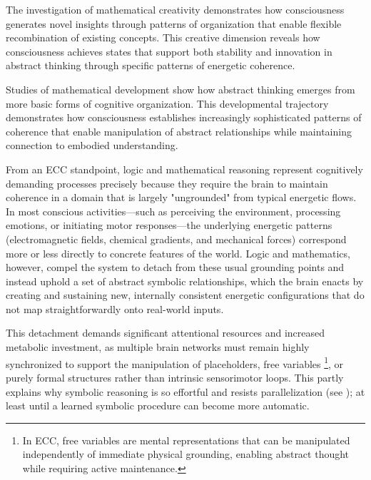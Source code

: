 The investigation of mathematical creativity \cite{Hadamard1945} demonstrates how consciousness generates novel insights through patterns of organization that enable flexible recombination of existing concepts. This creative dimension reveals how consciousness achieves states that support both stability and innovation in abstract thinking through specific patterns of energetic coherence.

Studies of mathematical development \cite{Piaget1952} show how abstract thinking emerges from more basic forms of cognitive organization. This developmental trajectory demonstrates how consciousness establishes increasingly sophisticated patterns of coherence that enable manipulation of abstract relationships while maintaining connection to embodied understanding.

From an ECC standpoint, logic and mathematical reasoning represent cognitively demanding processes precisely because they require the brain to maintain coherence in a domain that is largely "ungrounded" from typical energetic flows. In most conscious activities—such as perceiving the environment, processing emotions, or initiating motor responses—the underlying energetic patterns (electromagnetic fields, chemical gradients, and mechanical forces) correspond more or less directly to concrete features of the world. Logic and mathematics, however, compel the system to detach from these usual grounding points and instead uphold a set of abstract symbolic relationships, which the brain enacts by creating and sustaining new, internally consistent energetic configurations that do not map straightforwardly onto real-world inputs.

This detachment demands significant attentional resources and increased metabolic investment, as multiple brain networks must remain highly synchronized to support the manipulation of placeholders, free variables \footnote{In ECC, free variables are mental representations that can be manipulated independently of immediate physical grounding, enabling abstract thought while requiring active maintenance.}, or purely formal structures rather than intrinsic sensorimotor loops. This partly explains why symbolic reasoning is so effortful and resists parallelization (see \cite{Dehaene2011, kahneman2011thinking}); at least until a learned symbolic procedure can become more automatic.

